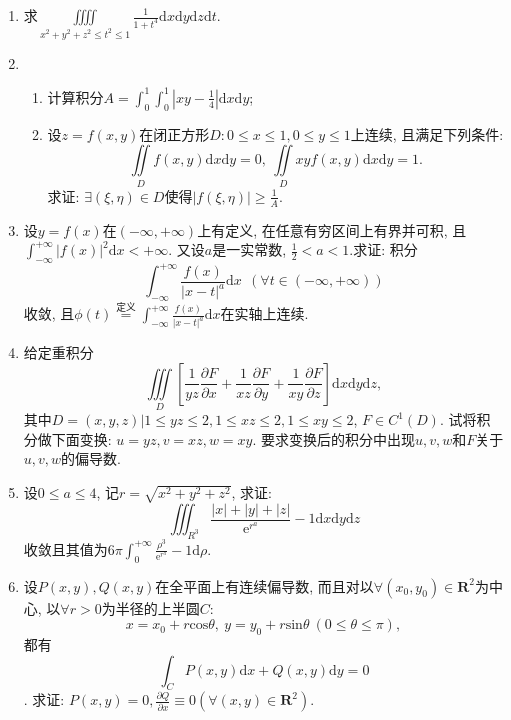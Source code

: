 \begin{enumerate}
\item 求$\displaystyle{\iiiint\limits_{x^2+y^2+z^2\le t^2\le 1}\frac{1}{1+t^4}\mathrm{d}x\mathrm{d}y\mathrm{d}z\mathrm{d}t}$.
\item 
\begin{enumerate}
	\item 计算积分$A=\int_{0}^{1}\int_{0}^{1}|xy-\frac{1}{4}|\mathrm{d}x\mathrm{d}y$;
	\item 设$z=f(x,y)$在闭正方形$D:0\le x\le 1,0\le y\le 1$上连续, 且满足下列条件:
	$$ \displaystyle{\iint\limits_{D}f(x,y)\mathrm{d}x\mathrm{d}y = 0,\ \iint\limits_{D}xyf(x,y)\mathrm{d}x\mathrm{d}y=1.}$$
		求证: $\exists (\xi,\eta)\in D$使得$|f(\xi,\eta)|\ge\frac{1}{A}$.
	\end{enumerate}	
\item 设$y=f(x)$在$(-\infty,+\infty)$上有定义, 在任意有穷区间上有界并可积, 且\\ $\displaystyle{\int_{-\infty}^{+\infty}|f(x)|^2\mathrm{d}x
<+\infty}$. 又设$a$是一实常数, $\frac{1}{2}<a<1$.求证: 积分
$$\displaystyle{\int_{-\infty}^{+\infty}\frac{f(x)}{|x-t|^a}\mathrm{d}x}\ \ (\forall t\in(-\infty,+\infty))$$收敛, 且$\phi(t)\overset{\text{定义}}{=}\int_{-\infty}^{+\infty}\frac{f(x)}{|x-t|^a}\mathrm{d}x$在实轴上连续.
\item 给定重积分$$\displaystyle{\iiint\limits_{D}\left[\frac{1}{yz}\frac{\partial F}{\partial x}+\frac{1}{xz}\frac{\partial F}{\partial y}+\frac{1}{xy}\frac{\partial F}{\partial z}\right]\mathrm{d}x\mathrm{d}y\mathrm{d}z}, $$
其中$D={(x,y,z)|1\le yz\le 2,1\le xz\le 2,1\le xy\le 2}$, $F\in C^1(D)$. 试将积分做下面变换: $u=yz,v=xz,w=xy$. 要求变换后的积分中出现$u,v,w$和$F$关于$u,v,w$的偏导数.
\item 设$0\le a\le 4$, 记$r=\sqrt{x^2+y^2+z^2}$, 求证:
$$\displaystyle{\iiint_{R^3}\frac{|x|+|y|+|z|}{\mathrm{e}^{r^a}}-1\mathrm{d}x\mathrm{d}y\mathrm{d}z}$$
收敛且其值为$6\pi\displaystyle{\int_{0}^{+\infty}\frac{\rho^3}{\mathrm{e}^{r^a}}-1\mathrm{d}\rho}$.
\item 设$P(x,y),Q(x,y)$在全平面上有连续偏导数, 而且对以$\forall (x_0,y_0)\in \bm{R}^2$为中心, 以$\forall r>0$为半径的上半圆$C$:$$
x=x_0+r\mathrm{cos}\theta,\ y=y_0+r\mathrm{sin}\theta\ (0\le \theta\le \pi),$$
都有$$\displaystyle{\int_{C}P(x,y)\mathrm{d}x+Q(x,y)\mathrm{d}y=0}$$.
求证: $P(x,y)=0,\frac{\partial Q}{\partial x}\equiv 0(\forall (x,y)\in \bm{R}^2)$.

\end{enumerate}